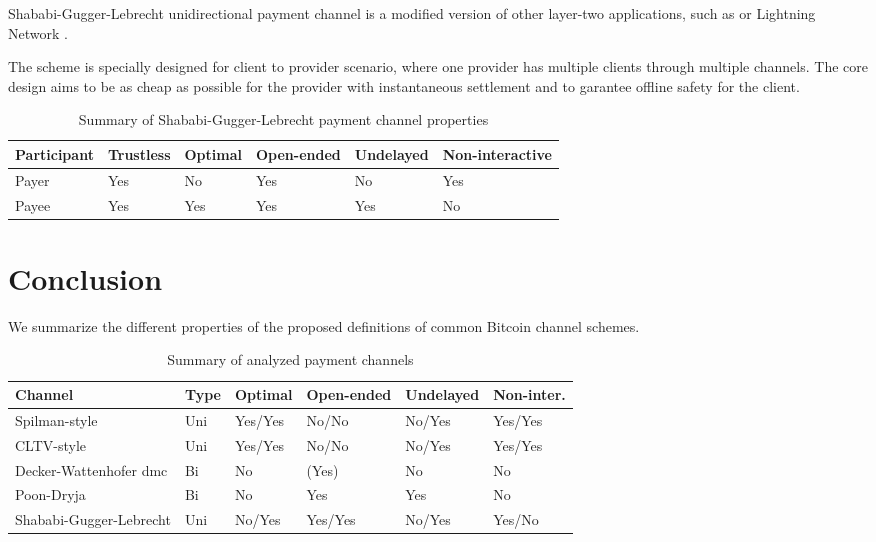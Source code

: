 \documentclass{llncs}
\begin{document}
Shababi-Gugger-Lebrecht unidirectional payment channel is a modified version of other layer-two applications, such as  or Lightning Network \cite{poon2016bitcoin, YoursLightningProtocol}.

The scheme is specially designed for client to provider scenario, where one provider has multiple clients through multiple channels. The core design aims to be as cheap as possible for the provider with instantaneous settlement and to garantee offline safety for the client.


\begin{table}[ht]
  \begin{tabularx}{\textwidth}{ | X | l | l | l | l | l |}
  \hline
  Participant & Trustless & Optimal & Open-ended & Undelayed & Non-interactive \\
  \hline \hline
  Payer & Yes & No & Yes & No & Yes \\ \hline
  Payee & Yes & Yes & Yes & Yes & No \\
  \hline
  \end{tabularx}
  \caption{Summary of Shababi-Gugger-Lebrecht payment channel properties}
  \label{fig:summaryShababiGuggerLebrechtPaymentChannel}
\end{table}

\section{Conclusion}

We summarize the different properties of the proposed definitions of common Bitcoin channel schemes.

\begin{table}[ht]
  \begin{tabularx}{\textwidth}{ | X | l | l | l | l | l |}
  \hline
  Channel & Type & Optimal & Open-ended & Undelayed & Non-inter. \\
  \hline \hline
  Spilman-style & Uni & Yes/Yes & No/No & No/Yes & Yes/Yes \\ \hline
  CLTV-style & Uni & Yes/Yes & No/No & No/Yes & Yes/Yes \\ \hline
  Decker-Wattenhofer \gls{dmc} & Bi & No & (Yes) & No & No \\ \hline
  Poon-Dryja & Bi & No & Yes & Yes & No \\ \hline
  Shababi-Gugger-Lebrecht & Uni & No/Yes & Yes/Yes & No/Yes & Yes/No \\
  \hline
  \end{tabularx}
  \caption{Summary of analyzed payment channels}
  \label{fig:summaryPaymentChannel}
\end{table}
\end{document}
